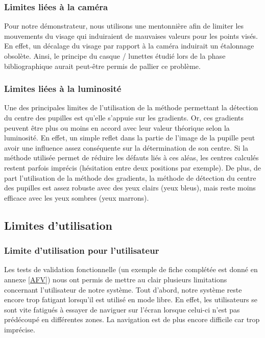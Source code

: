 \subsubsection{Limites liées à la caméra}

Pour notre démonstrateur, nous utilisons une mentonnière afin de limiter les mouvements du visage qui induiraient de mauvaises valeurs pour les points visés. En effet, un décalage du visage par rapport à la caméra induirait un étalonnage obsolète. Ainsi, le principe du casque / lunettes étudié lors de la phase bibliographique aurait peut-être permis de pallier ce problème.

\subsubsection{Limites liées à la luminosité}

Une des principales limites de l’utilisation de la méthode permettant la détection du centre des pupilles est qu’elle s’appuie sur les gradients. Or, ces gradients peuvent être plus ou moins en accord avec leur valeur théorique selon la luminosité. En effet, un simple reflet dans la partie de l’image de la pupille peut avoir une influence assez conséquente sur la détermination de son centre. Si la méthode utilisée permet de réduire les défauts liés à ces aléas, les centres calculés restent parfois imprécis (hésitation entre deux positions par exemple). De plus, de part l’utilisation de la méthode des gradients, la méthode de détection du centre des pupilles est assez robuste avec des yeux clairs (yeux bleus), mais reste moins efficace avec les yeux sombres (yeux marrons).

\subsection{Limites d'utilisation}

\subsubsection{Limite d’utilisation pour l’utilisateur}

Les tests de validation fonctionnelle (un exemple de fiche complétée est donné en annexe \ref{AFV}) nous ont permis de mettre au clair plusieurs limitations concernant l’utilisateur de notre système. Tout d’abord, notre système reste encore trop fatigant lorsqu’il est utilisé en mode libre. En effet, les utilisateurs se sont vite fatigués à essayer de naviguer sur l’écran lorsque celui-ci n’est pas prédécoupé en différentes zones. La navigation est de plus encore difficile car trop imprécise.

